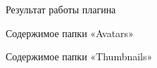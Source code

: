\clearpage

\begin{figure}[h!]
\caption{ Результат работы плагина }
\label{kucher_8:kucher_8}
\end{figure} 

\begin{figure}[h!]
\caption{ Содержимое папки «Avatars» }
\label{kucher_9:kucher_9}
\end{figure} 

\begin{figure}[h!]
\caption{ Содержимое папки «Thumbnails» }
\label{kucher_10:kucher_10}
\end{figure} 

\clearpage
